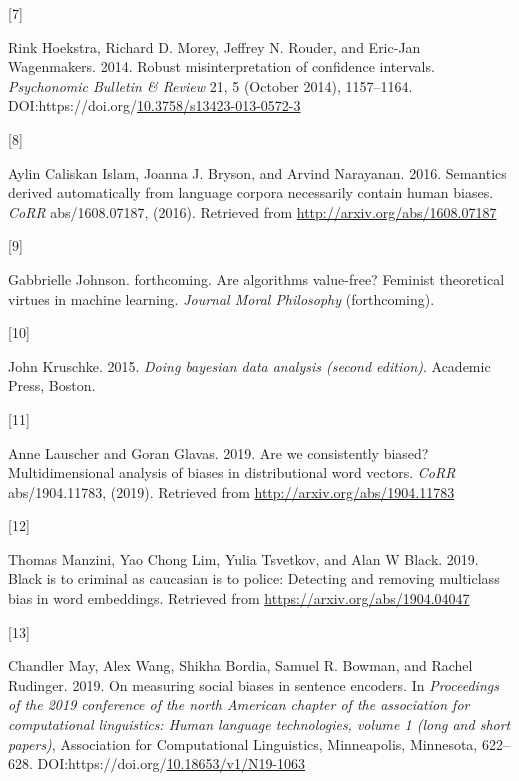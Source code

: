 \documentclass[
  12pt,
  dvipsnames,enabledeprecatedfontcommands]{scrartcl}
\newlength{\cslhangindent}
\newlength{\csllabelwidth}
\newlength{\cslentryspacingunit} %
\newenvironment{CSLReferences}[2] %
 {%
  \setlength{\parindent}{0pt}
  \ifodd #1
  \let\oldpar\par
  \def\par{\hangindent=\cslhangindent\oldpar}
  \fi
  \setlength{\parskip}{#2\cslentryspacingunit}
 }%
 {}
\newcommand{\CSLLeftMargin}[1]{\parbox[t]{\csllabelwidth}{#1}}
\newcommand{\CSLRightInline}[1]{\parbox[t]{\linewidth - \csllabelwidth}{#1}\break}
\begin{document}
\begin{CSLReferences}{0}{0}
\leavevmode{}%
\CSLLeftMargin{{[}7{]} }%
\CSLRightInline{Rink Hoekstra, Richard D. Morey, Jeffrey N. Rouder, and
Eric-Jan Wagenmakers. 2014. Robust misinterpretation of confidence
intervals. \emph{Psychonomic Bulletin \& Review} 21, 5 (October 2014),
1157--1164.
DOI:https://doi.org/\href{https://doi.org/10.3758/s13423-013-0572-3}{10.3758/s13423-013-0572-3}}

\leavevmode{}%
\CSLLeftMargin{{[}8{]} }%
\CSLRightInline{Aylin Caliskan Islam, Joanna J. Bryson, and Arvind
Narayanan. 2016. Semantics derived automatically from language corpora
necessarily contain human biases. \emph{CoRR} abs/1608.07187, (2016).
Retrieved from \url{http://arxiv.org/abs/1608.07187}}

\leavevmode{}%
\CSLLeftMargin{{[}9{]} }%
\CSLRightInline{Gabbrielle Johnson. forthcoming. Are algorithms
value-free? Feminist theoretical virtues in machine learning.
\emph{Journal Moral Philosophy} (forthcoming).}

\leavevmode{}%
\CSLLeftMargin{{[}10{]} }%
\CSLRightInline{John Kruschke. 2015. \emph{Doing bayesian data analysis
(second edition)}. Academic Press, Boston.}

\leavevmode{}%
\CSLLeftMargin{{[}11{]} }%
\CSLRightInline{Anne Lauscher and Goran Glavas. 2019. Are we
consistently biased? Multidimensional analysis of biases in
distributional word vectors. \emph{CoRR} abs/1904.11783, (2019).
Retrieved from \url{http://arxiv.org/abs/1904.11783}}

\leavevmode{}%
\CSLLeftMargin{{[}12{]} }%
\CSLRightInline{Thomas Manzini, Yao Chong Lim, Yulia Tsvetkov, and Alan
W Black. 2019. Black is to criminal as caucasian is to police: Detecting
and removing multiclass bias in word embeddings. Retrieved from
\url{https://arxiv.org/abs/1904.04047}}

\leavevmode{}%
\CSLLeftMargin{{[}13{]} }%
\CSLRightInline{Chandler May, Alex Wang, Shikha Bordia, Samuel R.
Bowman, and Rachel Rudinger. 2019. On measuring social biases in
sentence encoders. In \emph{Proceedings of the 2019 conference of the
north {A}merican chapter of the association for computational
linguistics: Human language technologies, volume 1 (long and short
papers)}, Association for Computational Linguistics, Minneapolis,
Minnesota, 622--628.
DOI:https://doi.org/\href{https://doi.org/10.18653/v1/N19-1063}{10.18653/v1/N19-1063}}


\end{CSLReferences}
\end{document}
